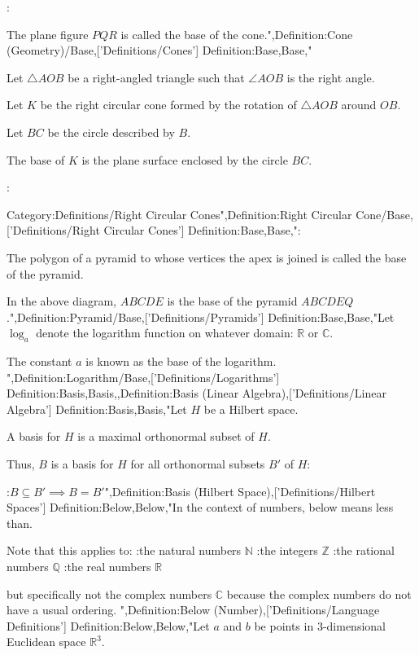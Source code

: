 :


The plane figure $PQR$ is called the base of the cone.",Definition:Cone (Geometry)/Base,['Definitions/Cones']
Definition:Base,Base,"

Let $\triangle AOB$ be a right-angled triangle such that $\angle AOB$ is the right angle.

Let $K$ be the right circular cone formed by the rotation of $\triangle AOB$ around $OB$.

Let $BC$ be the circle described by $B$.

The base of $K$ is the plane surface enclosed by the circle $BC$.



:



Category:Definitions/Right Circular Cones",Definition:Right Circular Cone/Base,['Definitions/Right Circular Cones']
Definition:Base,Base,":


The polygon of a pyramid to whose vertices the apex is joined is called the base of the pyramid.

In the above diagram, $ABCDE$ is the base of the pyramid $ABCDEQ$.",Definition:Pyramid/Base,['Definitions/Pyramids']
Definition:Base,Base,"Let $\log_a$ denote the logarithm function on whatever domain: $\mathbb R$ or $\mathbb C$.

The constant $a$ is known as the base of the logarithm.
",Definition:Logarithm/Base,['Definitions/Logarithms']
Definition:Basis,Basis,,Definition:Basis (Linear Algebra),['Definitions/Linear Algebra']
Definition:Basis,Basis,"Let $H$ be a Hilbert space.


A basis for $H$ is a maximal orthonormal subset of $H$.

Thus, $B$ is a basis for $H$  for all orthonormal subsets $B'$ of $H$:

:$B \subseteq B' \implies B = B'$",Definition:Basis (Hilbert Space),['Definitions/Hilbert Spaces']
Definition:Below,Below,"In the context of numbers, below means less than.

Note that this applies to:
:the natural numbers $\mathbb N$
:the integers $\mathbb Z$
:the rational numbers $\mathbb Q$
:the real numbers $\mathbb R$

but specifically not the complex numbers $\mathbb C$ because the complex numbers do not have a usual ordering.
",Definition:Below (Number),['Definitions/Language Definitions']
Definition:Below,Below,"Let $a$ and $b$ be points in $3$-dimensional Euclidean space $\mathbb R^3$.


